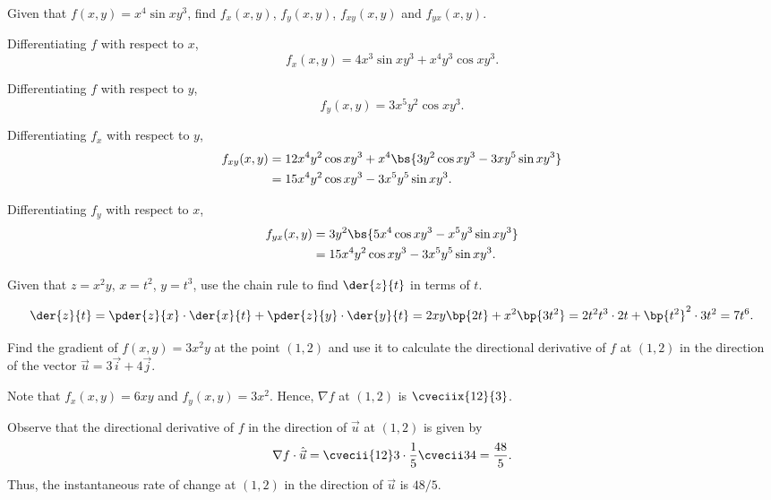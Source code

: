 \begin{problem}
    Given that $f(x, y) = x^4 \sin{xy^3}$, find $f_x(x, y)$, $f_y(x, y)$, $f_{xy}(x, y)$ and $f_{yx}(x, y)$.
\end{problem}
\begin{solution}
    Differentiating $f$ with respect to $x$, \[f_x(x, y) = 4x^3 \sin{xy^3} + x^4 y^3 \cos{xy^3}.\]

    Differentiating $f$ with respect to $y$, \[f_y(x, y) = 3x^5y^2\cos{xy^3}.\]

    Differentiating $f_x$ with respect to $y$, 
    \begin{align*}
        f_{xy}(x, y) &= 12x^4y^2\cos{xy^3} + x^4\bs{3y^2\cos{xy^3} - 3xy^5\sin{xy^3}}\\
        &= 15x^4y^2\cos{xy^3} - 3x^5y^5\sin{xy^3}.
    \end{align*}

    Differentiating $f_y$ with respect to $x$,
    \begin{align*}
        f_{yx}(x, y) &= 3y^2\bs{5x^4 \cos{xy^3} - x^5y^3\sin{xy^3}}\\
        &= 15x^4y^2 \cos{xy^3} - 3x^5y^5 \sin{xy^3}.
    \end{align*}
\end{solution}

\begin{problem}
    Given that $z = x^2y$, $x = t^2$, $y = t^3$, use the chain rule to find $\der{z}{t}$ in terms of $t$.
\end{problem}
\begin{solution}
    \[\der{z}{t} = \pder{z}{x} \cdot \der{x}{t} + \pder{z}{y} \cdot \der{y}{t} = 2xy \bp{2t} + x^2 \bp{3t^2} = 2t^2t^3 \cdot 2t + \bp{t^2}^2 \cdot 3t^2 = 7t^6.\]
\end{solution}

\begin{problem}
    Find the gradient of $f(x, y) = 3x^2y$ at the point $(1, 2)$ and use it to calculate the directional derivative of $f$ at $(1, 2)$ in the direction of the vector $\vec u = 3\vec i + 4\vec j$.
\end{problem}
\begin{solution}
    Note that $f_x(x, y) = 6xy$ and $f_y(x, y) = 3x^2$. Hence, $\nabla f$ at $(1, 2)$ is $\cveciix{12}{3}$. 
            
    Observe that the directional derivative of $f$ in the direction of $\vec u$ at $(1, 2)$ is given by \[\nabla f \cdot \hat{\vec u} = \cvecii{12}3 \cdot \frac15 \cvecii34 = \frac{48}5.\] Thus, the instantaneous rate of change at $(1, 2)$ in the direction of $\vec u$ is $48/5$.
\end{solution}

